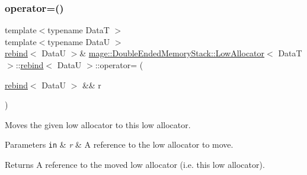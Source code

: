 \subsubsection{\texorpdfstring{operator=()}{operator=()}\hspace{0.1cm}{\footnotesize\ttfamily [2/2]}}
{\footnotesize\ttfamily template$<$typename DataT $>$ \\
template$<$typename DataU $>$ \\
\hyperlink{structmage_1_1_double_ended_memory_stack_1_1_low_allocator_1_1rebind}{rebind}$<$ DataU $>$\& \hyperlink{structmage_1_1_double_ended_memory_stack_1_1_low_allocator}{mage\+::\+Double\+Ended\+Memory\+Stack\+::\+Low\+Allocator}$<$ DataT $>$\+::\hyperlink{structmage_1_1_double_ended_memory_stack_1_1_low_allocator_1_1rebind}{rebind}$<$ DataU $>$\+::operator= (\begin{DoxyParamCaption}\item[{\hyperlink{structmage_1_1_double_ended_memory_stack_1_1_low_allocator_1_1rebind}{rebind}$<$ DataU $>$ \&\&}]{r }\end{DoxyParamCaption})\hspace{0.3cm}{\ttfamily [delete]}}

Moves the given low allocator to this low allocator.


\begin{DoxyParams}[1]{Parameters}
\mbox{\tt in}  & {\em r} & A reference to the low allocator to move. \\
\hline
\end{DoxyParams}
\begin{DoxyReturn}{Returns}
A reference to the moved low allocator (i.\+e. this low allocator). 
\end{DoxyReturn}
